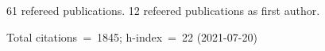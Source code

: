 61 refereed publications. 12 refeered publications as first author.

Total citations~=~1845; h-index~=~22 (2021-07-20)